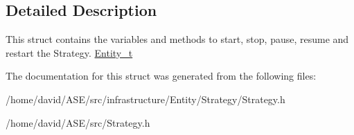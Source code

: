 \subsection{Detailed Description}
This struct contains the variables and methods to start, stop, pause, resume and restart the Strategy.  \hyperlink{structEntity__t}{Entity\_\-t} 

The documentation for this struct was generated from the following files:\begin{CompactItemize}
\item 
/home/david/ASE/src/infrastructure/Entity/Strategy/Strategy.h\item 
/home/david/ASE/src/Strategy.h\end{CompactItemize}
